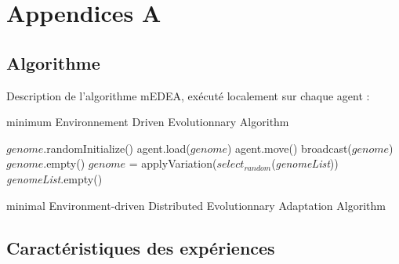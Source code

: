 \documentclass[a4paper,10pt]{report}
\begin{document}
	
	
	
	\appendix
	\chapter{Appendices A}
	
	
	\section{Algorithme}
	Description de l'algorithme mEDEA, exécuté localement sur chaque agent :
	
	\vspace{-5pt}
	\begin{algorithm}[H]
	\caption{minimum Environnement Driven Evolutionnary Algorithm}          %
	\label{alg:medea} 
	{\small
	\begin{algorithmic}
	\STATE $genome$.randomInitialize()
	\STATE agent.load($genome$)
	\ENDIF
	\STATE agent.move()
	\STATE broadcast($genome$)
	\ENDIF
	\ENDFOR
	\STATE $genome$.empty()
	\STATE $genome$ = applyVariation($select_{random}$(\textit{genomeList}))
	\ENDIF
	\STATE \textit{genomeList}.empty()
	\ENDWHILE
	\end{algorithmic}
	}
	\caption{minimal Environment-driven Distributed Evolutionnary Adaptation Algorithm}
	\end{algorithm}
	
	
	\section{Caractéristiques des expériences}
	
\end{document}
